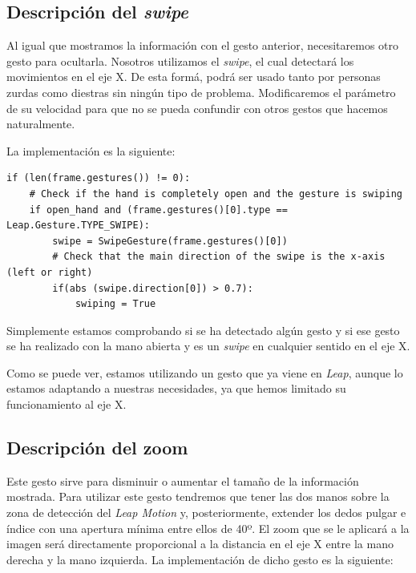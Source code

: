 \documentclass[11pt,a4paper]{article}
\begin{document}
\subsection{Descripción del \textit{swipe}}

Al igual que mostramos la información con el gesto anterior, necesitaremos otro gesto para ocultarla. Nosotros utilizamos el \textit{swipe}, el cual
detectará los movimientos en el eje X. De esta formá, podrá ser usado tanto por personas zurdas como diestras sin ningún tipo de problema.
Modificaremos el parámetro de su velocidad para que no se pueda confundir con otros gestos que hacemos naturalmente.

La implementación es la siguiente:

\begin{lstlisting}
if (len(frame.gestures()) != 0):
	# Check if the hand is completely open and the gesture is swiping
	if open_hand and (frame.gestures()[0].type == Leap.Gesture.TYPE_SWIPE):
		swipe = SwipeGesture(frame.gestures()[0])
		# Check that the main direction of the swipe is the x-axis (left or right)
		if(abs (swipe.direction[0]) > 0.7):
			swiping = True
\end{lstlisting}

Simplemente estamos comprobando si se ha detectado algún gesto y si ese gesto
se ha realizado con la mano abierta y es un \textit{swipe} en cualquier sentido
en el eje X.

Como se puede ver, estamos utilizando un gesto que ya viene en \textit{Leap}, aunque
lo estamos adaptando a nuestras necesidades, ya que hemos limitado su funcionamiento
al eje X.

\subsection{Descripción del zoom}

Este gesto sirve para disminuir o aumentar el tamaño de la información mostrada. Para utilizar este gesto tendremos que tener las dos manos
sobre la zona de detección del \textit{Leap Motion} y, posteriormente, extender los dedos pulgar e índice con una apertura mínima entre ellos de 40º.
El zoom que se le aplicará a la imagen será directamente proporcional a la distancia en el eje X entre la mano derecha y la mano izquierda. La
implementación de dicho gesto es la siguiente:
\end{document}
